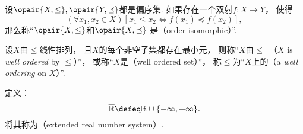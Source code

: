 \begin{definition}
设\(\opair{X,\leq},\opair{Y,\preceq}\)都是偏序集.
如果存在一个双射\(f\colon X \to Y\)，
使得\begin{equation*}
	(\forall x_1,x_2 \in X)
	[
		x_1 \leq x_2
		\iff
		f(x_1) \preceq f(x_2)
	],
\end{equation*}
那么称“\(\opair{X,\leq}\)和\(\opair{X,\preceq}\)
是（order isomorphic）”.
\end{definition}

\begin{definition}
设\(X\)由\(\leq\)线性排列，
且\(X\)的每个非空子集都存在最小元，
则称“\(X\)由\(\leq\)~（\(X\) is \emph{well ordered} by \(\leq\)）”，
或称“\(X\)是（well ordered set）”，
称\(\leq\)为“\(X\)上的（a \emph{well ordering} on \(X\)）”.
\end{definition}







\begin{definition}
定义：\begin{equation*}
	\overline{\mathbb{R}}
	\defeq
	\mathbb{R}
	\cup
	\{-\infty,+\infty\}.
\end{equation*}
将其称为（extended real number system）.
\end{definition}
